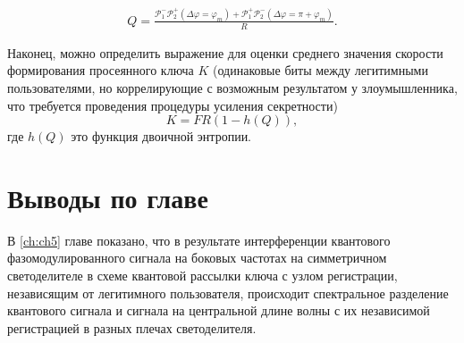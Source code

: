 \begin{align}
    Q=\frac{\mathcal{P}_{1}^{-}\mathcal{P}_{2}^{+}(\Delta\varphi=\varphi_m)+\mathcal{P}_{1}^{+}\mathcal{P}_{2}^{-}(\Delta\varphi=\pi+\varphi_m)}{R}.
\end{align}


Наконец, можно определить выражение для оценки среднего значения скорости формирования просеянного ключа $K$ (одинаковые биты между легитимными пользователями, но коррелирующие с возможным результатом у злоумышленника, что требуется проведения процедуры усиления секретности)
\begin{equation}
    K=FR(1-h(Q)),
\end{equation}
где $h(Q)$ это функция двоичной энтропии. 

\pagebreak

\section{Выводы по главе} \label{ch:ch5/sec8}


В \ref{ch:ch5} главе показано, что в результате интерференции квантового фазомодулированного сигнала на боковых частотах на симметричном светоделителе в схеме квантовой рассылки ключа с узлом регистрации, независящим от легитимного пользователя, происходит спектральное разделение квантового сигнала и сигнала на центральной длине волны с их независимой регистрацией в разных плечах светоделителя. 

\pagebreak
